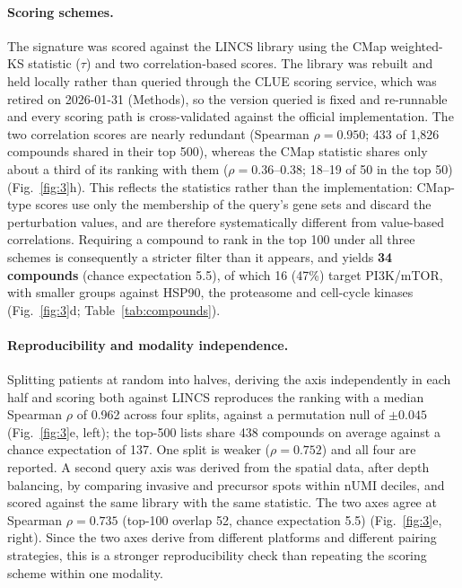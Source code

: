 \paragraph{Scoring schemes.} The signature was scored against the LINCS library using the
CMap weighted-KS statistic ($\tau$) and two correlation-based scores. The library was rebuilt
and held locally rather than queried through the CLUE scoring service, which was retired on
2026-01-31 (Methods), so the version queried is fixed and re-runnable and every scoring path
is cross-validated against the official implementation. The two correlation scores are
nearly redundant (Spearman $\rho=0.950$; 433 of 1,826 compounds shared in their top 500),
whereas the CMap statistic shares only about a third of its ranking with them
($\rho=0.36$--$0.38$; 18--19 of 50 in the top 50) (Fig.~\ref{fig:3}h). This reflects the
statistics rather than the implementation: CMap-type scores use only the membership of the
query's gene sets and discard the perturbation values, and are therefore systematically
different from value-based correlations. Requiring a compound to rank in the top 100 under
all three schemes is consequently a stricter filter than it appears, and yields
\textbf{34 compounds} (chance expectation 5.5), of which 16 (47\%) target PI3K/mTOR, with
smaller groups against HSP90, the proteasome and cell-cycle kinases (Fig.~\ref{fig:3}d; Table~\ref{tab:compounds}).



\paragraph{Reproducibility and modality independence.} Splitting patients at random into
halves, deriving the axis independently in each half and scoring both against LINCS
reproduces the ranking with a median Spearman $\rho$ of 0.962 across four splits, against a
permutation null of $\pm0.045$ (Fig.~\ref{fig:3}e, left); the top-500 lists share 438
compounds on average against a chance expectation of 137. One split is weaker ($\rho=0.752$)
and all four are reported. A second query axis was derived from the spatial data, after
depth balancing, by comparing invasive and precursor spots within nUMI deciles, and scored
against the same library with the same statistic. The two axes agree at Spearman
$\rho=0.735$ (top-100 overlap 52, chance expectation 5.5) (Fig.~\ref{fig:3}e, right). Since
the two axes derive from different platforms and different pairing strategies, this is a
stronger reproducibility check than repeating the scoring scheme within one modality.

